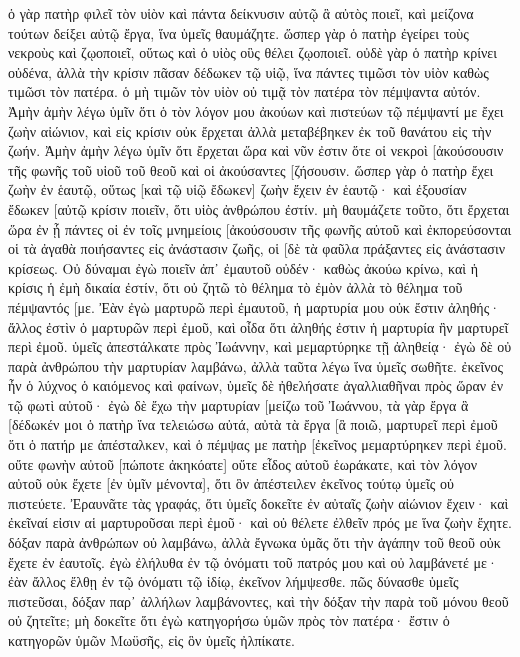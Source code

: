 ὁ γὰρ πατὴρ φιλεῖ τὸν υἱὸν καὶ πάντα δείκνυσιν αὐτῷ ἃ αὐτὸς ποιεῖ, καὶ μείζονα τούτων δείξει αὐτῷ ἔργα, ἵνα ὑμεῖς θαυμάζητε. 
ὥσπερ γὰρ ὁ πατὴρ ἐγείρει τοὺς νεκροὺς καὶ ζῳοποιεῖ, οὕτως καὶ ὁ υἱὸς οὓς θέλει ζῳοποιεῖ. 
οὐδὲ γὰρ ὁ πατὴρ κρίνει οὐδένα, ἀλλὰ τὴν κρίσιν πᾶσαν δέδωκεν τῷ υἱῷ, 
ἵνα πάντες τιμῶσι τὸν υἱὸν καθὼς τιμῶσι τὸν πατέρα. ὁ μὴ τιμῶν τὸν υἱὸν οὐ τιμᾷ τὸν πατέρα τὸν πέμψαντα αὐτόν. 
Ἀμὴν ἀμὴν λέγω ὑμῖν ὅτι ὁ τὸν λόγον μου ἀκούων καὶ πιστεύων τῷ πέμψαντί με ἔχει ζωὴν αἰώνιον, καὶ εἰς κρίσιν οὐκ ἔρχεται ἀλλὰ μεταβέβηκεν ἐκ τοῦ θανάτου εἰς τὴν ζωήν. 
Ἀμὴν ἀμὴν λέγω ὑμῖν ὅτι ἔρχεται ὥρα καὶ νῦν ἐστιν ὅτε οἱ νεκροὶ [ἀκούσουσιν τῆς φωνῆς τοῦ υἱοῦ τοῦ θεοῦ καὶ οἱ ἀκούσαντες [ζήσουσιν. 
ὥσπερ γὰρ ὁ πατὴρ ἔχει ζωὴν ἐν ἑαυτῷ, οὕτως [καὶ τῷ υἱῷ ἔδωκεν] ζωὴν ἔχειν ἐν ἑαυτῷ· 
καὶ ἐξουσίαν ἔδωκεν [αὐτῷ κρίσιν ποιεῖν, ὅτι υἱὸς ἀνθρώπου ἐστίν. 
μὴ θαυμάζετε τοῦτο, ὅτι ἔρχεται ὥρα ἐν ᾗ πάντες οἱ ἐν τοῖς μνημείοις [ἀκούσουσιν τῆς φωνῆς αὐτοῦ 
καὶ ἐκπορεύσονται οἱ τὰ ἀγαθὰ ποιήσαντες εἰς ἀνάστασιν ζωῆς, οἱ [δὲ τὰ φαῦλα πράξαντες εἰς ἀνάστασιν κρίσεως. 
Οὐ δύναμαι ἐγὼ ποιεῖν ἀπ᾽ ἐμαυτοῦ οὐδέν· καθὼς ἀκούω κρίνω, καὶ ἡ κρίσις ἡ ἐμὴ δικαία ἐστίν, ὅτι οὐ ζητῶ τὸ θέλημα τὸ ἐμὸν ἀλλὰ τὸ θέλημα τοῦ πέμψαντός [με. 
Ἐὰν ἐγὼ μαρτυρῶ περὶ ἐμαυτοῦ, ἡ μαρτυρία μου οὐκ ἔστιν ἀληθής· 
ἄλλος ἐστὶν ὁ μαρτυρῶν περὶ ἐμοῦ, καὶ οἶδα ὅτι ἀληθής ἐστιν ἡ μαρτυρία ἣν μαρτυρεῖ περὶ ἐμοῦ. 
ὑμεῖς ἀπεστάλκατε πρὸς Ἰωάννην, καὶ μεμαρτύρηκε τῇ ἀληθείᾳ· 
ἐγὼ δὲ οὐ παρὰ ἀνθρώπου τὴν μαρτυρίαν λαμβάνω, ἀλλὰ ταῦτα λέγω ἵνα ὑμεῖς σωθῆτε. 
ἐκεῖνος ἦν ὁ λύχνος ὁ καιόμενος καὶ φαίνων, ὑμεῖς δὲ ἠθελήσατε ἀγαλλιαθῆναι πρὸς ὥραν ἐν τῷ φωτὶ αὐτοῦ· 
ἐγὼ δὲ ἔχω τὴν μαρτυρίαν [μείζω τοῦ Ἰωάννου, τὰ γὰρ ἔργα ἃ [δέδωκέν μοι ὁ πατὴρ ἵνα τελειώσω αὐτά, αὐτὰ τὰ ἔργα [ἃ ποιῶ, μαρτυρεῖ περὶ ἐμοῦ ὅτι ὁ πατήρ με ἀπέσταλκεν, 
καὶ ὁ πέμψας με πατὴρ [ἐκεῖνος μεμαρτύρηκεν περὶ ἐμοῦ. οὔτε φωνὴν αὐτοῦ [πώποτε ἀκηκόατε] οὔτε εἶδος αὐτοῦ ἑωράκατε, 
καὶ τὸν λόγον αὐτοῦ οὐκ ἔχετε [ἐν ὑμῖν μένοντα], ὅτι ὃν ἀπέστειλεν ἐκεῖνος τούτῳ ὑμεῖς οὐ πιστεύετε. 
Ἐραυνᾶτε τὰς γραφάς, ὅτι ὑμεῖς δοκεῖτε ἐν αὐταῖς ζωὴν αἰώνιον ἔχειν· καὶ ἐκεῖναί εἰσιν αἱ μαρτυροῦσαι περὶ ἐμοῦ· 
καὶ οὐ θέλετε ἐλθεῖν πρός με ἵνα ζωὴν ἔχητε. 
δόξαν παρὰ ἀνθρώπων οὐ λαμβάνω, 
ἀλλὰ ἔγνωκα ὑμᾶς ὅτι τὴν ἀγάπην τοῦ θεοῦ οὐκ ἔχετε ἐν ἑαυτοῖς. 
ἐγὼ ἐλήλυθα ἐν τῷ ὀνόματι τοῦ πατρός μου καὶ οὐ λαμβάνετέ με· ἐὰν ἄλλος ἔλθῃ ἐν τῷ ὀνόματι τῷ ἰδίῳ, ἐκεῖνον λήμψεσθε. 
πῶς δύνασθε ὑμεῖς πιστεῦσαι, δόξαν παρ᾽ ἀλλήλων λαμβάνοντες, καὶ τὴν δόξαν τὴν παρὰ τοῦ μόνου θεοῦ οὐ ζητεῖτε; 
μὴ δοκεῖτε ὅτι ἐγὼ κατηγορήσω ὑμῶν πρὸς τὸν πατέρα· ἔστιν ὁ κατηγορῶν ὑμῶν Μωϋσῆς, εἰς ὃν ὑμεῖς ἠλπίκατε. 
